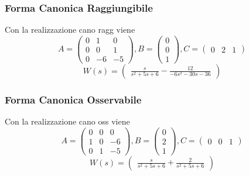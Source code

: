 \documentclass{article}
\begin{document}
\subsubsection{Forma Canonica Raggiungibile}
Con la realizzazione cano ragg viene \[ A = \left(\begin{matrix}0 & 1 & 0\\0 & 0 & 1\\0 & -6 & -5\end{matrix}\right), B = \left(\begin{matrix}0\\0\\1\end{matrix}\right), C= \left(\begin{matrix}0 & 2 & 1\end{matrix}\right) \]
\[ W(s) = \left(\begin{matrix}\frac{s}{s^{2} + 5 s + 6} - \frac{12}{- 6 s^{2} - 30 s - 36}\end{matrix}\right) 
\]\subsubsection{Forma Canonica Osservabile}
Con la realizzazione cano oss viene \[ A = \left(\begin{matrix}0 & 0 & 0\\1 & 0 & -6\\0 & 1 & -5\end{matrix}\right), B = \left(\begin{matrix}0\\2\\1\end{matrix}\right), C= \left(\begin{matrix}0 & 0 & 1\end{matrix}\right) \]
\[ W(s) = \left(\begin{matrix}\frac{s}{s^{2} + 5 s + 6} + \frac{2}{s^{2} + 5 s + 6}\end{matrix}\right) 
\] 
\end{document}
